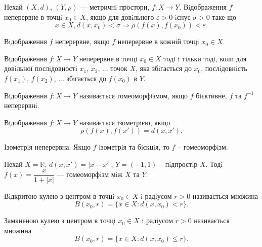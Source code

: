 \begin{definition}   
    Нехай $(X, d)$, $(Y, \rho)$ --- метричнi простори, $f : X \rightarrow Y$.
    Вiдображення $f$ неперервне в точцi $x_0 \in X$, якщо для довiльного
    $\varepsilon > 0$ iснує $\sigma > 0$ таке що
    $$x \in X, d(x, x_0) < \sigma \Rightarrow \rho(f(x), f(x_0)) < \varepsilon.$$
    
    Вiдображення $f$ неперервне, якщо $f$ неперервне в кожнiй точцi $x_0 \in X$.
\end{definition}

\begin{problem}
Вiдображення $f: X \rightarrow Y$ неперервне в точцi $x_0 \in X$ тодi i тiльки тодi,
коли для довiльної послiдовностi $x_1$, $x_2$, ... точок $X$, яка збiгається до $x_0$,
послiдовнiсть $f(x_1)$, $f(x_2)$, ... збiгається до $f(x_0)$ в $Y$.
\end{problem}

\begin{definition}[Гомеоморфiзм]
    Вiдображення $f: X \rightarrow Y$ називається гомеоморфiзмом, якщо
    $f$ бiєктивне, $f$ та $f^{-1}$ неперервнi.
\end{definition}

\begin{definition}[Ізометрiя]
    Вiдображення $f: X \rightarrow Y$ називається iзометрiєю, якщо
    $$\rho(f(x), f(x')) = d(x, x').$$
\end{definition}

\begin{problem}
    Iзометрiя неперервна. Якщо $f$ iзометрiя та бiєкцiя, то $f$ – гомеоморфiзм.
\end{problem}

\begin{example}
    Нехай $X = \mathbb{R}$, $d(x, x') = |x - x'|$, $Y = (-1, 1)$ – пiдпростiр $X$.
    Тодi $f(x) = \dfrac{x}{1+|x|}$ --- гомеоморфiзм мiж $X$ та $Y$.
\end{example}

\begin{definition}
    Вiдкритою кулею з центром в точцi $x_0 \in X$ i радiусом $r > 0$ називається
    множина
    $$B(x_0, r) = \{x \in X: d(x, x_0) < r\}.$$
\end{definition}

\begin{definition}
    Замкненою кулею з центром в точцi $x_0 \in X$ i радiусом $r > 0$ називається
    множина
    $$B(x_0, r) = \{x \in X: d(x, x_0) \leqslant r\}.$$
\end{definition}

